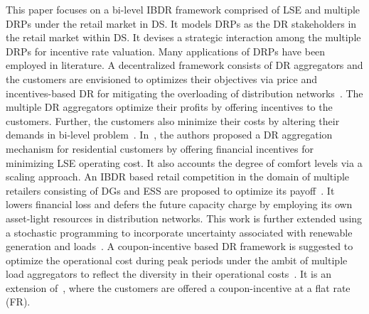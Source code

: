 \documentclass[journal]{IEEEtran}
\begin{document}
This paper focuses on a bi-level IBDR framework comprised of LSE and multiple DRPs under the retail market in DS. It models DRPs as the DR stakeholders in the retail market within DS. It devises a strategic interaction among the multiple DRPs for incentive rate valuation. Many applications of DRPs have been employed in literature. A decentralized framework consists of DR aggregators and the customers are envisioned to optimizes their objectives via price and incentives-based DR for mitigating the overloading of distribution networks~\cite{sarker2014optimal}. The multiple DR aggregators optimize their profits by offering incentives to the customers. Further, the customers also minimize their costs by altering their demands in bi-level problem~\cite{wang2019ensuring}. In~\cite{hu2016framework}, the authors proposed a DR aggregation mechanism for residential customers by offering financial incentives for minimizing LSE operating cost. It also accounts the degree of comfort levels via a scaling approach. An IBDR based retail competition in the domain of multiple retailers consisting of DGs and ESS are proposed to optimize its payoff~\cite{ghazvini2015multi}. It lowers financial loss and defers the future capacity charge by employing its own asset-light resources in distribution networks. This work is further extended using a stochastic programming to incorporate uncertainty associated with renewable generation and loads~\cite{ghazvini2015incentive}. A coupon-incentive based DR framework is suggested to optimize the operational cost during peak periods under the ambit of multiple load aggregators to reflect the diversity in their operational costs~\cite{li2016dynamic}. It is an extension of~\cite{zhong2012coupon}, where the customers are offered a coupon-incentive at a flat rate (FR). 
\end{document}
